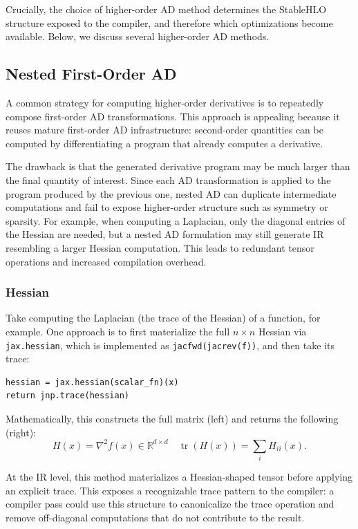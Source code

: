 \documentclass{article}
\theoremstyle{plain}
\theoremstyle{definition}
\theoremstyle{remark}
\begin{document}
Crucially, the choice
of higher-order AD method determines the StableHLO structure exposed to the
compiler, and therefore which optimizations become available. Below, we discuss several higher-order AD methods.

\subsection{Nested First-Order AD}

A common strategy for computing higher-order derivatives is to repeatedly
compose first-order AD transformations. This approach is appealing because it
reuses mature first-order AD infrastructure: second-order quantities can be
computed by differentiating a program that already computes a derivative.

The drawback is that the generated derivative program may be much larger
than the final quantity of interest. Since each AD transformation is applied
to the program produced by the previous one, nested AD can duplicate
intermediate computations and fail to expose higher-order structure such as
symmetry or sparsity. For example, when computing a Laplacian, only the
diagonal entries of the Hessian are needed, but a nested AD formulation may
still generate IR resembling a larger Hessian computation. This leads to
redundant tensor operations and increased
compilation overhead.

\subsubsection{Hessian}
Take computing the Laplacian (the trace of the Hessian) of a function, for example. One approach is to first materialize the full $n \times n$ Hessian via \texttt{jax.hessian}, which is implemented as \texttt{jacfwd(jacrev(f))}, and then take its trace:

\begin{verbatim}
hessian = jax.hessian(scalar_fn)(x)
return jnp.trace(hessian)
\end{verbatim}

Mathematically, this constructs the full matrix (left) and returns the following (right):
\[
  H(x) = \nabla^2 f(x) \in \mathbb{R}^{d \times d} \quad \operatorname{tr}(H(x)) = \sum_i H_{ii}(x).
\]

At the IR level, this method materializes a Hessian-shaped tensor
before applying an explicit trace. 
This exposes a recognizable trace pattern to the compiler: a compiler pass
could use this structure to canonicalize the trace operation and remove
off-diagonal computations that do not contribute to the result.
\end{document}

